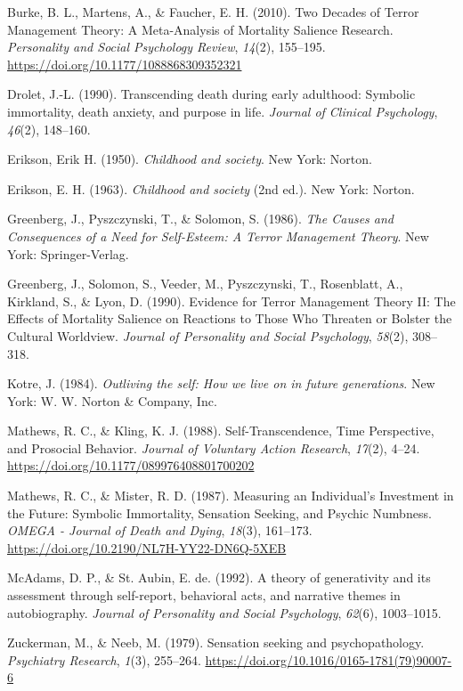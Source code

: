 \documentclass[
  man]{apa6}
\newlength{\cslhangindent}
\newenvironment{CSLReferences}[2] %
 {\begin{list}{}{%
  \setlength{\itemindent}{0pt}
  \setlength{\leftmargin}{0pt}
  \setlength{\parsep}{0pt}
  \ifodd #1
   \setlength{\leftmargin}{\cslhangindent}
   \setlength{\itemindent}{-1\cslhangindent}
  \fi
  \setlength{\itemsep}{#2\baselineskip}}}
 {\end{list}}
\begin{document}
\label{refs}
\begin{CSLReferences}{1}{0}
Burke, B. L., Martens, A., \& Faucher, E. H. (2010). Two Decades of Terror Management Theory: A Meta-Analysis of Mortality Salience Research. \emph{Personality and Social Psychology Review}, \emph{14}(2), 155--195. \url{https://doi.org/10.1177/1088868309352321}

Drolet, J.-L. (1990). Transcending death during early adulthood: Symbolic immortality, death anxiety, and purpose in life. \emph{Journal of Clinical Psychology}, \emph{46}(2), 148--160.

Erikson, Erik H. (1950). \emph{Childhood and society}. New York: Norton.

Erikson, E. H. (1963). \emph{Childhood and society} (2nd ed.). New York: Norton.

Greenberg, J., Pyszczynski, T., \& Solomon, S. (1986). \emph{The Causes and Consequences of a Need for Self-Esteem: A Terror Management Theory}. New York: Springer-Verlag.

Greenberg, J., Solomon, S., Veeder, M., Pyszczynski, T., Rosenblatt, A., Kirkland, S., \& Lyon, D. (1990). Evidence for Terror Management Theory II: The Effects of Mortality Salience on Reactions to Those Who Threaten or Bolster the Cultural Worldview. \emph{Journal of Personality and Social Psychology}, \emph{58}(2), 308--318.

Kotre, J. (1984). \emph{Outliving the self: How we live on in future generations}. New York: W. W. Norton \& Company, Inc.

Mathews, R. C., \& Kling, K. J. (1988). Self-Transcendence, Time Perspective, and Prosocial Behavior. \emph{Journal of Voluntary Action Research}, \emph{17}(2), 4--24. \url{https://doi.org/10.1177/089976408801700202}

Mathews, R. C., \& Mister, R. D. (1987). Measuring an Individual's Investment in the Future: Symbolic Immortality, Sensation Seeking, and Psychic Numbness. \emph{OMEGA - Journal of Death and Dying}, \emph{18}(3), 161--173. \url{https://doi.org/10.2190/NL7H-YY22-DN6Q-5XEB}

McAdams, D. P., \& St. Aubin, E. de. (1992). A theory of generativity and its assessment through self-report, behavioral acts, and narrative themes in autobiography. \emph{Journal of Personality and Social Psychology}, \emph{62}(6), 1003--1015.

Zuckerman, M., \& Neeb, M. (1979). Sensation seeking and psychopathology. \emph{Psychiatry Research}, \emph{1}(3), 255--264. \url{https://doi.org/10.1016/0165-1781(79)90007-6}

\end{CSLReferences}
\end{document}
